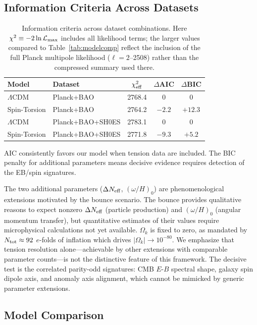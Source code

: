 \documentclass[aps,prd,twocolumn,superscriptaddress,showpacs,preprintnumbers,nofootinbib,longbibliography,floatfix]{revtex4-2}
\newcommand{\Neff}{N_{\rm eff}}
\begin{document}
\subsection{Information Criteria Across Datasets}

\begin{table}[h]
\caption{\label{tab:ic} Information criteria across dataset combinations. Here $\chi^2 \equiv -2\ln\mathcal{L}_{\rm max}$ includes all likelihood terms; the larger values compared to Table~\ref{tab:modelcomp} reflect the inclusion of the full Planck multipole likelihood ($\ell = 2$--2508) rather than the compressed summary used there.}
\begin{ruledtabular}
\begin{tabular}{llccc}
Model & Dataset & $\chi^2_{\rm eff}$ & $\Delta$AIC & $\Delta$BIC \\
\hline
$\Lambda$CDM & Planck+BAO & 2768.4 & 0 & 0 \\
Spin-Torsion & Planck+BAO & 2764.2 & $-2.2$ & $+12.3$ \\
$\Lambda$CDM & Planck+BAO+SH0ES & 2783.1 & 0 & 0 \\
Spin-Torsion & Planck+BAO+SH0ES & 2771.8 & $-9.3$ & $+5.2$ \\
\end{tabular}
\end{ruledtabular}
\end{table}

AIC consistently favors our model when tension data are included. The BIC penalty for additional parameters means decisive evidence requires detection of the EB/spin signatures.

The two additional parameters ($\Delta\Neff$, $(\omega/H)_0$) are phenomenological extensions motivated by the bounce scenario. The bounce provides qualitative reasons to expect nonzero $\Delta\Neff$ (particle production) and $(\omega/H)_0$ (angular momentum transfer), but quantitative estimates of their values require microphysical calculations not yet available. $\Omega_k$ is fixed to zero, as mandated by $N_{\rm tot}\approx 92$ $e$-folds of inflation which drives $|\Omega_k|\to 10^{-80}$. We emphasize that tension resolution alone---achievable by other extensions with comparable parameter counts---is not the distinctive feature of this framework. The decisive test is the correlated parity-odd signatures: CMB $E$-$B$ spectral shape, galaxy spin dipole axis, and anomaly axis alignment, which cannot be mimicked by generic parameter extensions.


\subsection{Model Comparison}\label{sec:fullcomp}
\end{document}
